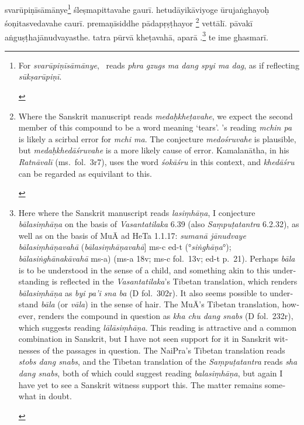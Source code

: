 \documentclass[naipra.tex]{subfiles}
\begin{document}
\begin{sanskrit}
\pstart
svarūpiṇīsāmānye\footnote{
	\begin{english}%
		For \emph{svarūpiṇīsāmānye}, \TIB\ reads \emph{phra gzugs ma dang spyi ma dag}, as if reflecting \emph{sūkṣarūpiṇī}.
	\end{english}
}  śleṣmapittavahe gaurī. 
hetudāyikāviyoge ūrujaṅghayoḥ śoṇitasvedavahe caurī. 
premaṇīsiddhe pādapṛṣṭhayor \footnote{
	\begin{english}%
		Where the Sanskrit manuscript reads \emph{medaḥkheṭavahe}, we expect the second member of this compound to be a word meaning `tears'.
		\TIB 's reading \emph{mchin pa} is likely a scirbal error for \emph{mchi ma}.
		The conjecture \emph{medośruvahe} is plausible, but \emph{medaḥkhedāśruvahe} is a more likely cause of error. 
		Kamalanātha, in his \emph{Ratnāvalī} (ms.\ fol.\ 3r7), uses the word \emph{śokāśru} in this context, and \emph{khedāśru} can be regarded as equivilant to this.
	\end{english}
} vettālī. 
pāvakī aṅguṣṭhajānudvayasthe.
tatra pūrvā kheṭavahā, aparā .\footnote{
	\begin{english}%
		Here where the Sanskrit manuscript reads \emph{lasiṃhāṇa}, I conjecture \emph{bālasiṃhāṇa} on the basis of \emph{Vasantatilaka} 6.39 (also \emph{Saṃpuṭatantra} 6.2.32), as well as on the basis of MuĀ ad HeTa 1.1.17: \emph{sumanā jānudvaye bālasiṃhāṇavahā} (\emph{bālasiṃhāṇavahā}] ms-c ed-t (°\emph{siṅghāṇa}°); \emph{bālasiṅghānakāvahā} ms-a) (ms-a 18v; ms-c fol.\ 13v; ed-t p.\ 21).
		Perhaps \emph{bāla} is to be understood in the sense of a child, and something akin to this understanding is reflected in the \emph{Vasantatilaka}'s Tibetan translation, which renders \emph{bālasiṃhāṇa} as \emph{byi pa'i sna ba} (D fol.\ 302r).
		It also seems possible to understand \emph{bāla} (or \emph{vāla}) in the sense of hair.
		The MuĀ's Tibetan translation, however, renders the compound in question as \emph{kha chu dang snabs} (D fol.\ 232r), which suggests reading \emph{lālāsiṃhāṇa}.
		This reading is attractive and a common combination in Sanskrit, but I have not seen support for it in Sanskrit witnesses of the passages in question.
		The NaiPra's Tibetan translation reads \emph{stobs dang snabs}, and the Tibetan translation of the \emph{Saṃpuṭatantra} reads \emph{sha dang snabs}, both of which could suggest reading \emph{balasiṃhāṇa}, but again I have yet to see a Sanskrit witness support this.
		The matter remains somewhat in doubt.
	\end{english}
}
te ime ghasmarī. 
\pend


\end{sanskrit}
\end{document}
